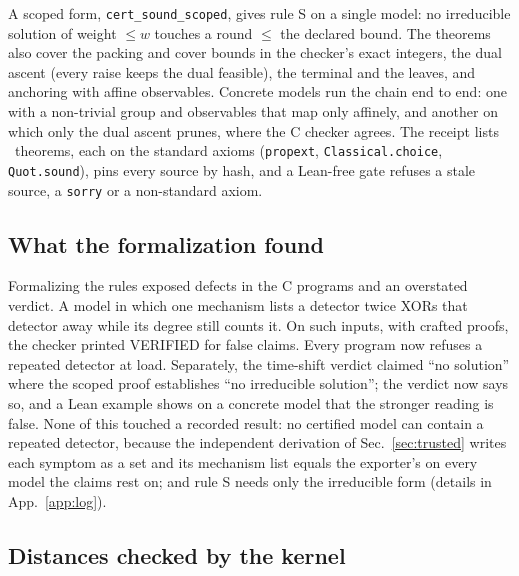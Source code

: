 \documentclass[aps,pra,twocolumn,superscriptaddress,nofootinbib,longbibliography,floatfix]{revtex4-2}
\begin{document}
A scoped form, \texttt{cert\_sound\_scoped}, gives rule S on a single model: no irreducible solution of weight $\le w$ touches a round $\le$ the declared bound. The theorems also cover the packing and cover bounds in the checker's exact integers, the dual ascent (every raise keeps the dual feasible), the terminal and the leaves, and anchoring with affine observables. Concrete models run the chain end to end: one with a non-trivial group and observables that map only affinely, and another on which only the dual ascent prunes, where the C checker agrees. The receipt lists \LeanTheorems\ theorems, each on the standard axioms (\texttt{propext}, \texttt{Classical.choice}, \texttt{Quot.sound}), pins every source by hash, and a Lean-free gate refuses a stale source, a \texttt{sorry} or a non-standard axiom.

\subsection{What the formalization found}
\label{sec:findings}

Formalizing the rules exposed defects in the C programs and an overstated verdict. A model in which one mechanism lists a detector twice XORs that detector away while its degree still counts it. On such inputs, with crafted proofs, the checker printed VERIFIED for false claims. Every program now refuses a repeated detector at load. Separately, the time-shift verdict claimed ``no solution'' where the scoped proof establishes ``no irreducible solution''; the verdict now says so, and a Lean example shows on a concrete model that the stronger reading is false. None of this touched a recorded result: no certified model can contain a repeated detector, because the independent derivation of Sec.~\ref{sec:trusted} writes each symptom as a set and its mechanism list equals the exporter's on every model the claims rest on; and rule S needs only the irreducible form (details in App.~\ref{app:log}).

\subsection{Distances checked by the kernel}
\end{document}

